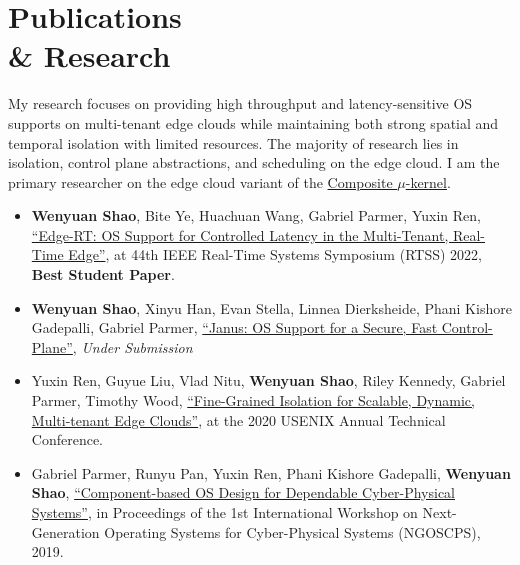 \section{Publications\\ \& Research}
{\hspace*{1.7em} My research focuses on providing high throughput and latency-sensitive OS supports on multi-tenant edge clouds while maintaining both strong spatial and temporal isolation with limited resources.
The majority of research lies in isolation, control plane abstractions, and scheduling on the edge cloud.
I am the primary researcher on the edge cloud variant of the \href{https://composite.seas.gwu.edu/}{Composite $\mu$-kernel}.}

\vspace{0.2em}
\begin{itemize}[leftmargin=*]
  \setlength\itemsep{-0.0em}
  \item \textbf{Wenyuan Shao}, Bite Ye, Huachuan Wang, Gabriel Parmer, Yuxin Ren, \href{https://www2.seas.gwu.edu/~gparmer/publications/rtss22edgert.pdf}{\enquote{Edge-RT: OS Support for Controlled Latency in the Multi-Tenant, Real-Time Edge}}, at 44th IEEE Real-Time Systems Symposium (RTSS) 2022, \textbf{Best Student Paper}.
  \item \textbf{Wenyuan Shao}, Xinyu Han, Evan Stella, Linnea Dierksheide, Phani Kishore Gadepalli, Gabriel Parmer, \href{}{\enquote{Janus: OS Support for a Secure, Fast Control-Plane}}, \textit{Under Submission}
  \item Yuxin Ren, Guyue Liu, Vlad Nitu, \textbf{Wenyuan Shao}, Riley Kennedy, Gabriel Parmer, Timothy Wood, \href{https://www.usenix.org/system/files/atc20-ren.pdf}{\enquote{Fine-Grained Isolation for Scalable, Dynamic, Multi-tenant Edge Clouds}}, at the 2020 USENIX Annual Technical Conference.
  \item Gabriel Parmer, Runyu Pan, Yuxin Ren, Phani Kishore Gadepalli, \textbf{Wenyuan Shao}, \href{https://www2.seas.gwu.edu/~gparmer/publications/ngoscps_19.pdf}{\enquote{Component-based OS Design for Dependable Cyber-Physical Systems}}, in Proceedings of the 1st International Workshop on Next-Generation Operating Systems for Cyber-Physical Systems (NGOSCPS), 2019.
\end{itemize} 

